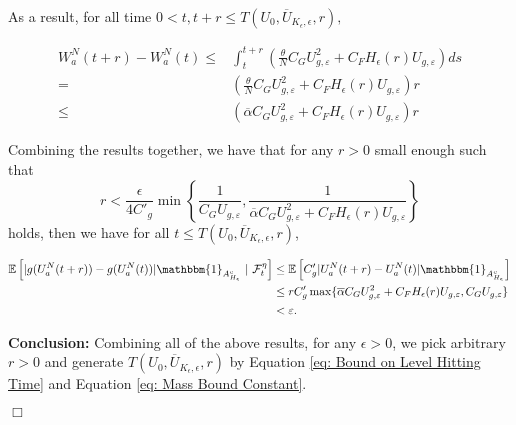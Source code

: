 \documentclass[12pt]{article}
\newenvironment {proof}{{\noindent\bf Proof }}{\hfill $\Box$ \medskip}
\def \bar{\overline}
\begin{document}
\begin{proof}
As a result, for all time $ 0 < t , t+ r \leq T(U_0,\overline{U}_{K_{\epsilon},\epsilon},r),$

\begin{align*}
W^N_a(t+r)-W^N_a(t) 
\leq &\int_{t}^{t+r} 
        \left( \frac{\theta}{N} C_G U_{g,\varepsilon}^2
        +
        C_F H_{\epsilon}(r) U_{g,\varepsilon}
        \right)
        ds\\
=&\left( \frac{\theta}{N} C_G U_{g,\varepsilon}^2
        +
        C_F H_{\epsilon}(r) U_{g,\varepsilon}
        \right) r \\
\leq&\left( \bar{\alpha} C_G U_{g,\varepsilon}^2
        +
        C_F H_{\epsilon}(r) U_{g,\varepsilon}
        \right) r
\end{align*}

Combining the results together, we have that for any $r > 0$ small enough such that 
\begin{equation}
r < \frac{\epsilon  }{4C'_g}\min\left\{\frac{1}{C_G U_{g,\varepsilon}}, \frac{1}{\bar{\alpha} C_G U_{g,\varepsilon}^2
        +
        C_F H_{\epsilon}(r) U_{g,\varepsilon}}\right\}    
\end{equation}
holds, then we have for all $t \leq T(U_0,\overline{U}_{K_{\epsilon},\epsilon},r)$,

\begin{equation}
\begin{aligned}
\mathbb{E}\left[|g(U^{N}_{a}(t+r ))-g(U^{N}_{a}(t))| \mathbbm{1}_{A_{H_{\epsilon}}^c} ~|~{\cal F}_t^{
\eta} \right] 
& \leq  \mathbb{E}\left[C'_{g} |U^{N}_{a}(t+r )-U^{N}_{a}(t)|\mathbbm{1}_{A_{H_{\epsilon}}^c} \right] \\
&\leq r C'_g \max\{ \bar{\alpha} C_G U_{g,\varepsilon}^2
        +
        C_F H_{\epsilon}(r) U_{g,\varepsilon}
        , C_G U_{g, \varepsilon}\} \\
        & < \varepsilon.
\end{aligned}
\end{equation}



\textbf{Conclusion:} Combining all of the above results, for any $\epsilon > 0$, we pick arbitrary $r>0$ and
generate $T(U_0,\overline{U}_{K_{\epsilon},\epsilon},r)$ by 
Equation \eqref{eq: Bound on Level Hitting Time} and Equation \eqref{eq: Mass Bound Constant}.


\end{proof}
\end{document}
